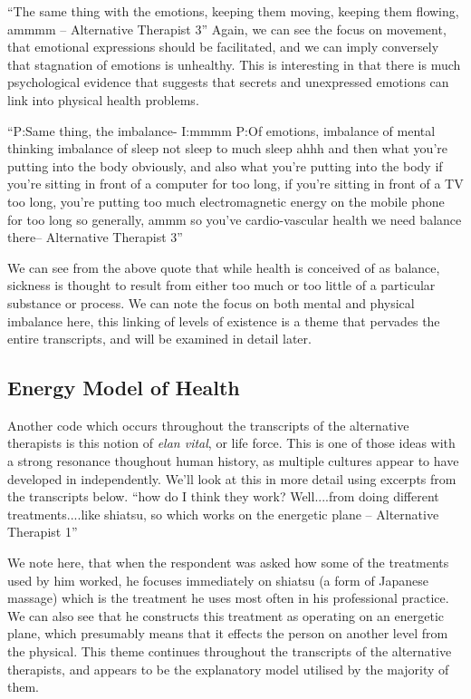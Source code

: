 ``The same thing with the emotions, keeping them moving, keeping them flowing, ammmm – Alternative Therapist 3''
Again, we can see the focus on movement, that emotional expressions should be facilitated, and we can imply conversely that stagnation of emotions is unhealthy. This is interesting in that there is much psychological evidence that suggests that secrets and unexpressed emotions can link into physical health problems. 

``P:Same thing, the imbalance-
I:mmmm
P:Of emotions, imbalance of mental thinking imbalance of sleep not sleep to much sleep ahhh and then what you're putting into the body obviously, and also what you're putting into the body if you're sitting in front of a computer for too long, if you're sitting in front of a TV too long, you're putting too much electromagnetic energy on the mobile phone for too long so generally, ammm so you've cardio-vascular health we need balance there-- Alternative Therapist 3''

We can see from the above quote that while health is conceived of as balance, sickness is thought to result from either too much or too little of a particular substance or process. We can note the focus on both mental and physical imbalance here, this linking of levels of existence is a theme that pervades the entire transcripts, and  will be examined in detail later. 

\subsection{Energy Model of Health}

Another code which occurs throughout the transcripts of the alternative therapists is this notion of \textit{elan vital}, or life force. This is one of those ideas with a strong resonance thoughout human history, as multiple cultures appear to have developed in independently. We'll look at this in more detail using excerpts from the transcripts below. 
``how do I think they work? Well....from doing different treatments....like shiatsu, so which works on the energetic plane – Alternative Therapist 1''

We note here, that when the respondent was asked how some of the treatments used by him worked, he focuses immediately on shiatsu (a form of Japanese massage) which is the treatment he uses most often in his professional practice. We can also see that he constructs this treatment as operating on an energetic plane, which presumably means that it effects the person on another level from the physical. This theme continues throughout the transcripts of the alternative therapists, and appears to be the explanatory model utilised by the majority of them. 

